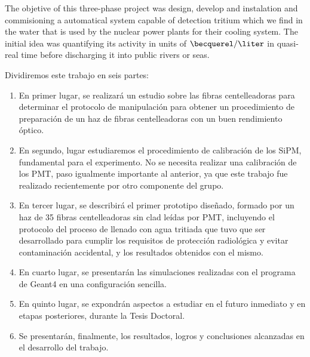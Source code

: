 The objetive of this three-phase project was design, develop and instalation and commisioning a automatical system capable of detection tritium which we find in the water that is used by the nuclear power plants for their cooling system. The initial idea was quantifying its activity in units of $\becquerel/\liter$ in quasi-real time before discharging it into public rivers or seas. 



Dividiremos este trabajo en seis partes:
\begin{enumerate}
\item{} En primer lugar, se realizará un estudio sobre las fibras centelleadoras para  determinar  el protocolo de manipulación para obtener un  procedimiento de preparación de  un haz de fibras centelleadoras con un buen rendimiento óptico. 

\item{} En segundo, lugar estudiaremos el procedimiento de calibración de los SiPM,  fundamental para el experimento.  No se necesita realizar una calibración de los PMT, paso igualmente importante al anterior, ya que este trabajo fue realizado recientemente por otro componente del grupo.

\item{} En tercer lugar, se describirá  el primer prototipo diseñado, formado por un haz de 35 fibras centelleadoras sin clad leídas por PMT,  incluyendo el protocolo del proceso de llenado con agua tritiada que tuvo que ser desarrollado para cumplir los requisitos de protección radiológica y evitar contaminación accidental,  y los  resultados obtenidos con el mismo.

\item{} En cuarto lugar, se presentarán las simulaciones realizadas con el programa de Geant4 en una configuración sencilla.

\item{} En quinto lugar, se expondrán aspectos a estudiar en el futuro inmediato y en etapas posteriores, durante la Tesis Doctoral. 


\item{} Se presentarán, finalmente, los resultados, logros y conclusiones alcanzadas en el desarrollo del  trabajo.

\end{enumerate}